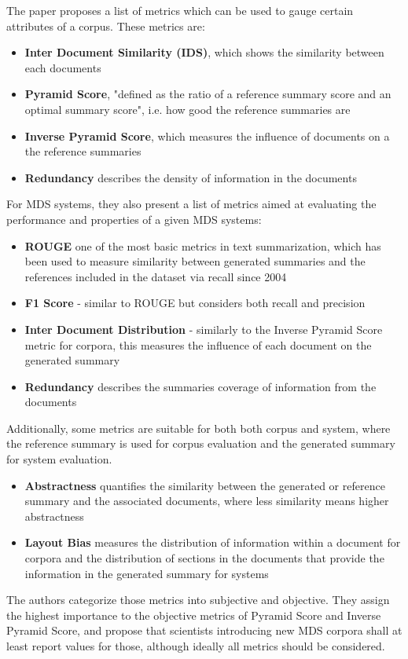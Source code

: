 \documentclass[20_original-paper.tex]{subfiles}
\begin{document}
The paper proposes a list of metrics which can be used to gauge certain attributes of a corpus. These metrics are:

\begin{itemize}
    \item \textbf{Inter Document Similarity (IDS)}, which shows the similarity between each documents
    \item \textbf{Pyramid Score}, "defined as the ratio of a reference summary score and an optimal summary score"\cite{dey-etal-2020-corpora},
          i.e. how good the reference summaries are
    \item \textbf{Inverse Pyramid Score}, which measures the influence of documents on a the reference summaries
    \item \textbf{Redundancy} describes the density of information in the documents
\end{itemize}

For MDS systems, they also present a list of metrics aimed at evaluating the performance and properties of a given MDS systems:

\begin{itemize}
    \item \textbf{ROUGE} one of the most basic metrics in text summarization,
          which has been used to measure similarity between generated summaries and the references included in the dataset via recall since 2004\cite{lin-2004-rouge}
    \item \textbf{F1 Score} - similar to ROUGE but considers both recall and precision
    \item \textbf{Inter Document Distribution} - similarly to the Inverse Pyramid Score metric for corpora, this measures the influence of each document on the generated summary
    \item \textbf{Redundancy} describes the summaries coverage of information from the documents

\end{itemize}

Additionally, some metrics are suitable for both both corpus and system, where the reference summary is used for corpus evaluation and the generated summary for system evaluation.

\begin{itemize}
    \item \textbf{Abstractness} quantifies the similarity between the generated or reference summary and the associated documents, where less similarity means higher abstractness
    \item \textbf{Layout Bias} measures the distribution of information within a document for corpora and the distribution of sections in the documents that provide the information in the generated summary for systems
\end{itemize}

The authors categorize those metrics into subjective and objective.
They assign the highest importance to the objective metrics of Pyramid Score and Inverse Pyramid Score,
and propose that scientists introducing new MDS corpora shall at least report values for those, although ideally all metrics should be considered.
\end{document}
